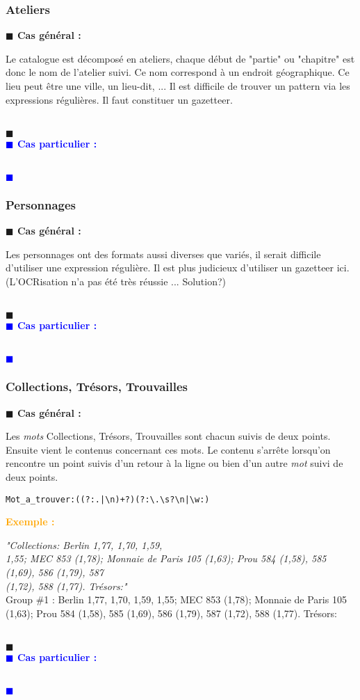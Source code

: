 \documentclass[a4paper, 11pt]{article}
\newenvironment{general}
    {
    \noindent\textbf{\textcolor{dark-blue}{$\blacksquare$  Cas général : \\}}
    }
    {
    ~\\\noindent\textcolor{dark-blue}{$\blacksquare$}\\
    }
\newenvironment{particulier}
    {
    \noindent\textbf{\textcolor{blue}{$\blacksquare$  Cas particulier : \\}}
    }
    {
    \\\noindent\textcolor{blue}{$\blacksquare$}\\
    }
\newenvironment{exemple}
    {
    \noindent\textbf{\textcolor{orange}{
    Exemple : \\}}
    }
    {\\
    }
\begin{document}
\subsubsection{Ateliers}
\begin{general}
Le catalogue est décomposé en ateliers, chaque début de "partie" ou "chapitre" est donc le nom de l'atelier suivi. Ce nom correspond à un endroit géographique. Ce lieu peut être une ville, un lieu-dit, ... Il est difficile de trouver un pattern via les expressions régulières. Il faut constituer un gazetteer.
\end{general}
\begin{particulier}
\end{particulier}

\subsubsection{Personnages}
\begin{general}
Les personnages ont des formats aussi diverses que variés, il serait difficile d'utiliser une expression régulière. Il est plus judicieux d'utiliser un gazetteer ici. (L'OCRisation n'a pas été très réussie ... Solution?)
\end{general}
\begin{particulier}
\end{particulier}

\subsubsection{Collections, Trésors, Trouvailles}
\begin{general}
Les \textit{mots} Collections, Trésors, Trouvailles sont chacun suivis de deux points. Ensuite vient le contenus concernant ces mots. Le contenu s'arrête lorsqu'on rencontre un point suivis d'un retour à la ligne ou bien d'un autre \textit{mot} suivi de deux points.
\begin{verbatim}
Mot_a_trouver:((?:.|\n)+?)(?:\.\s?\n|\w:)
\end{verbatim}
\begin{exemple}
\emph{"Collections: Berlin 1,77, 1,70, 1,59, \\
        1,55; MEC 853 (1,78); Monnaie de Paris 105 (1,63); Prou 584 (1,58), 585 (1,69), 586 (1,79), 587 \\
        (1,72), 588 (1,77). Trésors:"}\\
Group \#1 :  Berlin 1,77, 1,70, 1,59,
        1,55; MEC 853 (1,78); Monnaie de Paris 105 (1,63); Prou 584 (1,58), 585 (1,69), 586 (1,79), 587 (1,72), 588 (1,77). Trésors:
\end{exemple}
\end{general}
\begin{particulier}
\end{particulier}
\end{document}
